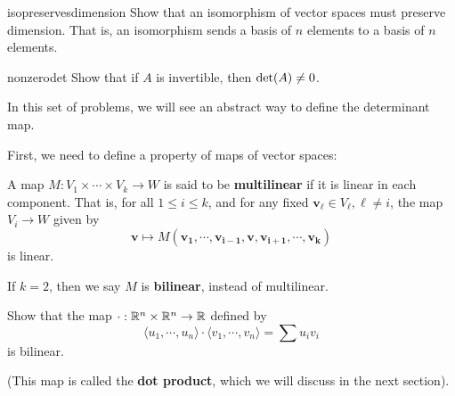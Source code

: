 \begin{problem}{isopreservesdimension}
    Show that an isomorphism of vector spaces must preserve dimension.  That is, an isomorphism sends a basis of $n$ elements to a basis  of $n$ elements.
\end{problem}

\begin{problem}{nonzerodet}
    Show that if $A$ is invertible, then $\textnormal{det}(A) \neq 0$.
\end{problem}

In this set of problems, we will see an abstract way to define the determinant map.  

First, we need to define a property of maps of vector spaces:

\begin{definition}
    A map $M : V_1 \times \cdots \times V_k \to W$ is said to be \textbf{multilinear} if it is linear in each component.  That is, for all $1 \leq i \leq k$, and for any fixed $\bm{v_\ell} \in V_\ell, \ell \neq i$, the map $V_i \to W$ given by $$\bm{v} \mapsto M(\bm{v_1}, \cdots, \bm{v_{i-1}}, \bm{v}, \bm{v_{i+1}}, \cdots, \bm{v_k})$$ is linear.
    
    If $k=2$, then we say $M$ is \textbf{bilinear}, instead of multilinear.
    \end{definition}

\begin{problem}
    Show that the map $\cdot : \mathbb{R}^n \times \mathbb{R}^n \to \mathbb{R}$ defined by $$\langle u_1, \cdots, u_n \rangle \cdot \langle v_1 , \cdots, v_n \rangle = \sum u_iv_i$$
    is bilinear. 
    
    (This map is called the \textbf{dot product}, which we will discuss in the next section). 
\end{problem}


